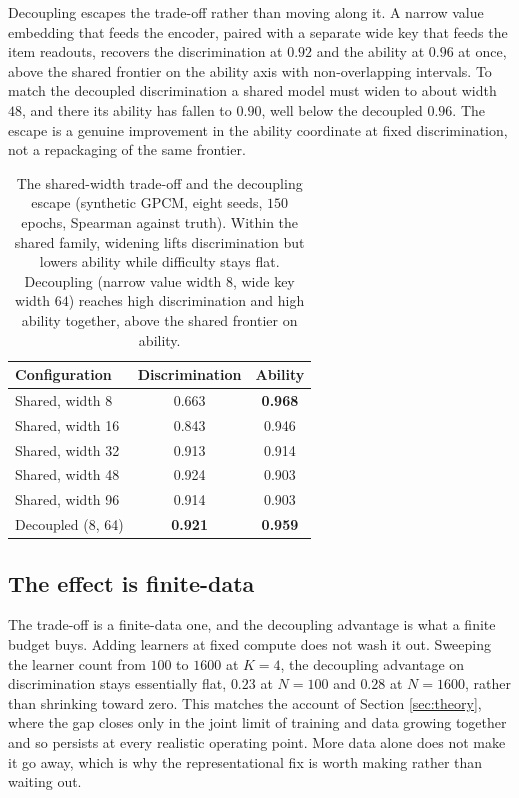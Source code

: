 \documentclass[sigconf,nonacm,screen]{acmart}
\begin{document}
Decoupling escapes the trade-off rather than moving along it. A narrow value
embedding that feeds the encoder, paired with a separate wide key that feeds the
item readouts, recovers the discrimination at $0.92$ and the ability at $0.96$ at
once, above the shared frontier on the ability axis with non-overlapping intervals.
To match the decoupled discrimination a shared model must widen to about width $48$,
and there its ability has fallen to $0.90$, well below the decoupled $0.96$. The
escape is a genuine improvement in the ability coordinate at fixed discrimination,
not a repackaging of the same frontier.

\begin{table}[t]
\caption{The shared-width trade-off and the decoupling escape (synthetic GPCM, eight
seeds, $150$ epochs, Spearman against truth). Within the shared family, widening
lifts discrimination but lowers ability while difficulty stays flat. Decoupling
(narrow value width $8$, wide key width $64$) reaches high discrimination and high
ability together, above the shared frontier on ability.}
\label{tab:escape}
\small
\begin{tabular}{@{}lcc@{}}
\toprule
Configuration & Discrimination & Ability \\
\midrule
Shared, width 8   & 0.663 & \textbf{0.968} \\
Shared, width 16  & 0.843 & 0.946 \\
Shared, width 32  & 0.913 & 0.914 \\
Shared, width 48  & 0.924 & 0.903 \\
Shared, width 96  & 0.914 & 0.903 \\
\midrule
Decoupled (8, 64) & \textbf{0.921} & \textbf{0.959} \\
\bottomrule
\end{tabular}
\end{table}

\subsection{The effect is finite-data}
The trade-off is a finite-data one, and the decoupling advantage is what a finite
budget buys. Adding learners at fixed compute does not wash it out. Sweeping the
learner count from $100$ to $1600$ at $K=4$, the decoupling advantage on
discrimination stays essentially flat, $0.23$ at $N=100$ and $0.28$ at $N=1600$,
rather than shrinking toward zero. This matches the account of Section
\ref{sec:theory}, where the gap closes only in the joint limit of training and data
growing together and so persists at every realistic operating point. More data alone
does not make it go away, which is why the representational fix is worth making
rather than waiting out.
\end{document}
